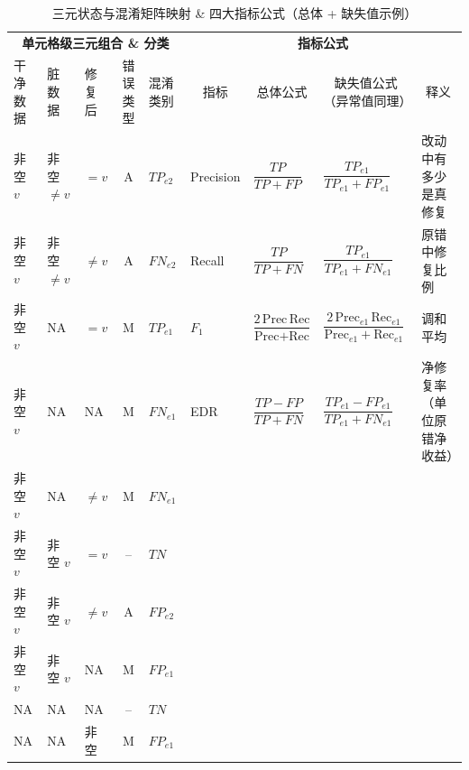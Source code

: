 \documentclass[10pt]{article} %
\numberwithin{equation}{section}
\begin{document}
\begin{table}[t]
\centering\footnotesize
\renewcommand{\arraystretch}{1.5}
\setlength{\tabcolsep}{5pt}
\caption{三元状态与混淆矩阵映射 \& 四大指标公式（总体 + 缺失值示例）}
\begin{adjustbox}{max width=\textwidth}
\begin{tabular}{lllcl|lll p{4.6cm}}
\toprule
\multicolumn{5}{c|}{\bfseries 单元格级三元组合 \& 分类} &
\multicolumn{4}{c}{\bfseries 指标公式}\\
\cmidrule(lr){1-5}\cmidrule(l){6-9}
干净数据 & 脏数据 & 修复后 & 错误类型 & 混淆类别 &
\multicolumn{1}{c}{指标} & \multicolumn{1}{c}{总体公式} &
\multicolumn{1}{c}{缺失值公式（异常值同理）} & \multicolumn{1}{c}{释义} \\
\midrule
非空 $v$ & 非空 $\neq v$ & $=v$            & A & $TP_{e2}$ &
Precision & $\dfrac{TP}{TP+FP}$ & $\dfrac{TP_{e1}}{TP_{e1}+FP_{e1}}$ & 改动中有多少是真修复 \\
非空 $v$ & 非空 $\neq v$ & $\neq v$         & A & $FN_{e2}$ &
Recall    & $\dfrac{TP}{TP+FN}$ & $\dfrac{TP_{e1}}{TP_{e1}+FN_{e1}}$ & 原错中修复比例 \\
非空 $v$ & $\text{NA}$   & $=v$             & M & $TP_{e1}$ &
$F_1$     & $\dfrac{2\,\text{Prec}\,\text{Rec}}{\text{Prec}+\text{Rec}}$ &
$\dfrac{2\,\text{Prec}_{e1}\,\text{Rec}_{e1}}{\text{Prec}_{e1}+\text{Rec}_{e1}}$ &
调和平均 \\
非空 $v$ & $\text{NA}$   & $\text{NA}$      & M & $FN_{e1}$ &
EDR       & $\dfrac{TP-FP}{TP+FN}$ &
$\dfrac{TP_{e1}-FP_{e1}}{TP_{e1}+FN_{e1}}$ & 净修复率（单位原错净收益） \\
非空 $v$ & $\text{NA}$   & $\neq v$         & M & $FN_{e1}$ & \\
非空 $v$ & 非空 $v$      & $=v$             & – & $TN$      & & & & \\
非空 $v$ & 非空 $v$      & $\neq v$         & A & $FP_{e2}$ & & & & \\
非空 $v$ & 非空 $v$      & $\text{NA}$      & M & $FP_{e1}$ & & & & \\
$\text{NA}$ & $\text{NA}$ & $\text{NA}$      & – & $TN$      & & & & \\
$\text{NA}$ & $\text{NA}$ & 非空             & M & $FP_{e1}$ & & & & \\
\bottomrule
\end{tabular}
\end{adjustbox}
\label{tab:all-in-one}
\end{table}
\end{document}
